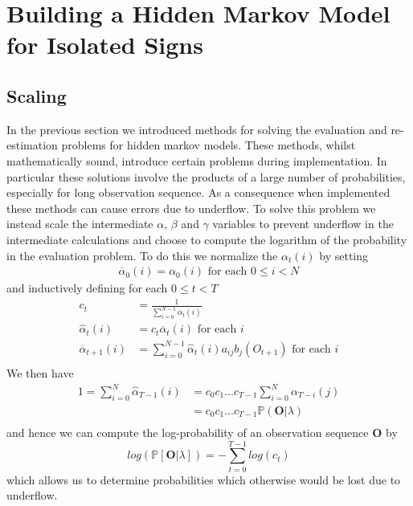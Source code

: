 \chapter{Building a Hidden Markov Model for Isolated Signs}
\ifpdf
    \graphicspath{{Chapter2/Chapter2Figs/PNG/}{Chapter2/Chapter2Figs/PDF/}{Chapter2/Chapter2Figs/}}
\else
    \graphicspath{{Chapter2/Chapter2Figs/EPS/}{Chapter2/Chapter2Figs/}}
\fi

\section{Scaling}
In the previous section we introduced methods for solving the evaluation and re-estimation problems for hidden markov models. These methods, whilst mathematically sound, introduce certain problems during implementation. In particular these solutions involve the products of a large number of probabilities, especially for long observation sequence. As a consequence when implemented these methods can cause errors due to underflow. To solve this problem we instead scale the intermediate $\alpha$, $\beta$ and $\gamma$ variables to prevent underflow in the intermediate calculations and choose to compute the logarithm of the probability in the evaluation problem. To do this we normalize the $\alpha_t(i)$ by setting
\begin{align*}
\overline{\alpha}_0(i) = \alpha_0(i) \text{ for each $0\leq i<N$} 
\end{align*}
and inductively defining for each $0\leq t < T$
\begin{align*}
c_t &= \frac{1}{\sum_{i=0}^{N-1}\overline{\alpha}_t(i)}\\
\hat{\alpha}_t(i) &= c_t\overline{\alpha}_t(i)\text{ for each $i$}\\
\overline{\alpha}_{t+1}(i) &= \sum_{i=0}^{N-1}\hat{\alpha}_t(i)a_{ij}b_j(O_{t+1}) \text{ for each $i$}\\
\end{align*}
We then have
\begin{align*}
1 = \sum_{i=0}^{N}\hat{\alpha}_{T-1}(i) &= c_0c_1\dots c_{T-1}\sum_{i=0}^{N}\alpha_{T-i}(j)\\
&=c_0c_1\dots c_{T-1}\mathbb{P}(\mathbf{O}|\lambda)\\
\end{align*}
and hence we can compute the log-probability of an observation sequence $\mathbf{O}$ by
\begin{equation*}
log(\mathbb{P}[\mathbf{O}|\lambda]) = -\sum_{t=0}^{T-1}log(c_t)
\end{equation*}
which allows us to determine probabilities which otherwise would be lost due to underflow. 


